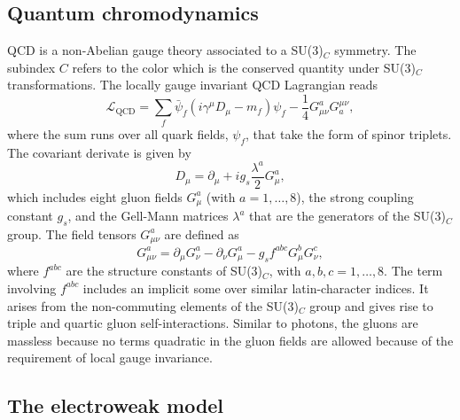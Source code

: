 \subsection{Quantum chromodynamics}
\label{subsec:qcd}
QCD is a non-Abelian gauge theory associated to a SU(3)$_C$ symmetry. The subindex $C$ refers to the color which is the conserved quantity under SU(3)$_C$ transformations.
The locally gauge invariant QCD Lagrangian reads
\begin{equation}
  \mathcal{L}_{\text{QCD}} = \sum_f \bar{\psi}_f(i\gamma^\mu D_\mu - m_f)\psi_f - \frac{1}{4}G_{\mu\nu}^aG^{\mu\nu}_{a},  \label{eq:lqcd}
\end{equation}
where the sum runs over all quark fields, $\psi_f$, that take the form of spinor triplets. 
The covariant derivate is given by
\begin{equation}
    D_\mu = \partial_\mu + i g_s \frac{\lambda^a}{2} G_\mu^a,
\end{equation}
which includes eight gluon fields $G_\mu^a$ (with $a = 1, \ldots, 8$), the strong coupling constant $g_s$, and the Gell-Mann matrices $\lambda^a$ that are the generators of the SU(3)$_C$ group.
The field tensors $G_{\mu\nu}^a$ are defined as
\begin{equation}
  \label{eq:qcd-tensor}
  G_{\mu\nu}^a = \partial_\mu G_\nu^a - \partial_\nu G_\mu^a - g_s f^{abc}G_\mu^b G_\nu^c,
\end{equation}
where $f^{abc}$ are the structure constants of SU(3)$_C$, with $a, b, c = 1, \ldots, 8$. 
The term involving $f^{abc}$ includes an implicit some over similar latin-character indices. It arises from the non-commuting elements of the SU(3)$_C$ group and gives rise to triple and quartic gluon self-interactions. 
Similar to photons, the gluons are massless because no terms quadratic in the gluon fields are allowed because of the requirement of local gauge invariance. 



\subsection{The electroweak model}
\label{subsec:ew-model}



